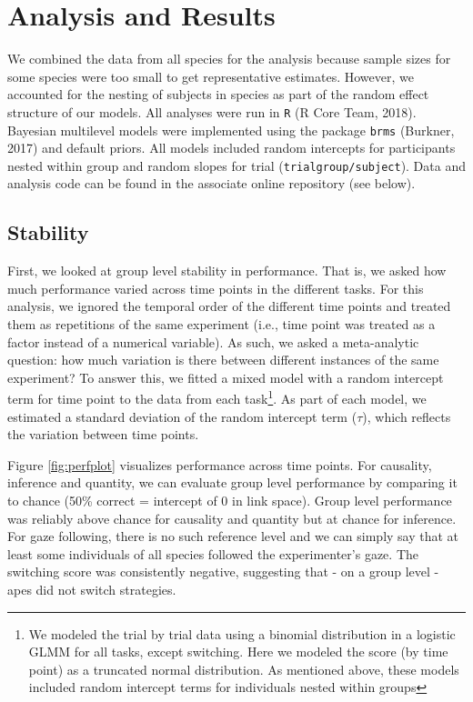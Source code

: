 \documentclass[10pt, letterpaper]{article}
\begin{document}
\hypertarget{analysis-and-results}{%
\section{Analysis and Results}\label{analysis-and-results}}

We combined the data from all species for the analysis because sample
sizes for some species were too small to get representative estimates.
However, we accounted for the nesting of subjects in species as part of
the random effect structure of our models. All analyses were run in
\texttt{R} (R Core Team, 2018). Bayesian multilevel models were
implemented using the package \texttt{brms} (Burkner, 2017) and default
priors. All models included random intercepts for participants nested
within group and random slopes for trial
(\texttt{trial\textbar{}group/subject}). Data and analysis code can be
found in the associate online repository (see below).

\hypertarget{stability}{%
\subsection{Stability}\label{stability}}

First, we looked at group level stability in performance. That is, we
asked how much performance varied across time points in the different
tasks. For this analysis, we ignored the temporal order of the different
time points and treated them as repetitions of the same experiment
(i.e., time point was treated as a factor instead of a numerical
variable). As such, we asked a meta-analytic question: how much
variation is there between different instances of the same experiment?
To answer this, we fitted a mixed model with a random intercept term for
time point to the data from each task\footnote{We modeled the trial by
  trial data using a binomial distribution in a logistic GLMM for all
  tasks, except switching. Here we modeled the score (by time point) as
  a truncated normal distribution. As mentioned above, these models
  included random intercept terms for individuals nested within groups}.
As part of each model, we estimated a standard deviation of the random
intercept term (\(\tau\)), which reflects the variation between time
points.

Figure \ref{fig:perfplot} visualizes performance across time points. For
causality, inference and quantity, we can evaluate group level
performance by comparing it to chance (50\% correct = intercept of 0 in
link space). Group level performance was reliably above chance for
causality and quantity but at chance for inference. For gaze following,
there is no such reference level and we can simply say that at least
some individuals of all species followed the experimenter's gaze. The
switching score was consistently negative, suggesting that - on a group
level - apes did not switch strategies.
\end{document}

